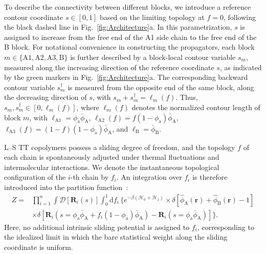     
    To describe the connectivity between different blocks, we introduce a reference contour coordinate $s\in[0,1]$ based on the limiting topology at $f=0$, following the black dashed line in Fig.~\ref{fig:Architecture}a.
    In this parametrization, $s$ is assigned to increase from the free end of the A1 side chain to the free end of the B block.
    For notational convenience in constructing the propagators, each block $m\in\{\mathrm{A1},\mathrm{A2},\mathrm{A3},\mathrm{B}\}$ is further described by a block-local contour variable $s_m$, measured along the increasing direction of the reference coordinate $s$, as indicated by the green markers in Fig.~\ref{fig:Architecture}a.
    The corresponding backward contour variable $s_m^\dagger$ is measured from the opposite end of the same block, along the decreasing direction of $s$, with $s_m+s_m^\dagger=\ell_m(f)$.
    Thus, $s_m,s_m^\dagger\in[0,\ell_m(f)]$, where $\ell_m(f)$ denotes the normalized contour length of block $m$, with $\ell_{\mathrm{A1}}=\phi_{\mathrm a}\bar{\phi}_{\mathrm A}$, $\ell_{\mathrm{A2}}(f)=f(1-\phi_{\mathrm a})\bar{\phi}_{\mathrm A}$, $\ell_{\mathrm{A3}}(f)=(1-f)(1-\phi_{\mathrm a})\bar{\phi}_{\mathrm A}$, and $\ell_{\mathrm{B}}=\bar{\phi}_{\mathrm B}$.
        

    L--S TT copolymers possess a sliding degree of freedom, and the topology $f$ of each chain is spontaneously adjusted under thermal fluctuations and intermolecular interactions.
    We denote the instantaneous topological configuration of the $i$-th chain by $f_i$.
    An integration over $f_i$ is therefore introduced into the partition function~\cite{Zhao2024Phase}:
    \begin{equation}
        \begin{split}
            Z = & \prod_{i=1}^n \int \mathcal{D}[\bm{R}_i(s)] \int_0^1 \mathrm{d}f_i\, \bigg\{ e^{-\beta(\mathcal{H}_0 + \mathcal{H}_1)} 
            \times \delta[\hat{\phi}_{\mathrm{A}}(\bm{r}) + \hat{\phi}_{\mathrm{B}}(\bm{r}) - 1]\\
            & \times \delta[\bm{R}_i(s=\phi_{\mathrm{a}}\bar{\phi}_{\mathrm{A}}+f_i(1-\phi_{\mathrm{a}})\bar{\phi}_{\mathrm{A}}) 
            - \bm{R}_i(s=\phi_{\mathrm{a}}\bar{\phi}_{\mathrm{A}})] \bigg\}.
        \end{split}
    \end{equation}
    Here, no additional intrinsic sliding potential is assigned to $f_i$, corresponding to the idealized limit in which the bare statistical weight along the sliding coordinate is uniform.
    
